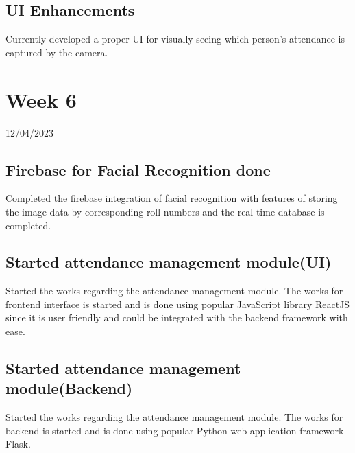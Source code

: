 \documentclass[12pt]{book}
\begin{document}
	\section{UI Enhancements}
	Currently developed a proper UI for visually seeing which person's attendance is captured by the camera.
	
	
	\chapter{Week 6}
	\justifying
	\large
	12/04/2023
	
	\paragraph{}
	\section{Firebase for Facial Recognition done}
	Completed the firebase integration of facial recognition with features of storing the image data by corresponding roll numbers and the real-time database is completed.
	\section{Started attendance management module(UI)}
	Started the works regarding the attendance management module. The works for frontend interface is started and is done using popular JavaScript library ReactJS since it is user friendly and could be integrated with the backend framework with ease.
	\section{Started attendance management module(Backend)}
	Started the works regarding the attendance management module. The works for backend is started and is done using popular Python web application framework Flask.
	
\end{document}
